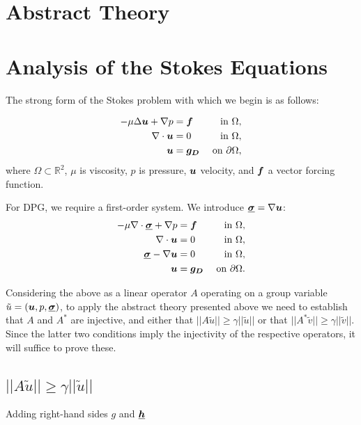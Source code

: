 

\section{Abstract Theory}

\section{Analysis of the Stokes Equations}
The strong form of the Stokes problem with which we begin is as follows:

\begin{align}
- \mu \Delta \vect{u} + \NVRgrad p &= \vect{f} & \text{ in } \Omega, \label{NVR:eq:strongfirst1} \\
\NVRdiv \vect{u} &= 0 & \text{ in } \Omega, \\
\vect{u} &= \vect{g_{D}} & \text{ on } \partial\Omega,\label{NVR:eq:stronglast1}
\end{align}
where $\Omega \subset \mathbb{R}^{2}$, $\mu$ is viscosity, $p$ is pressure, $\vect{u}$ velocity, and $\vect{f}$ a vector forcing function.

For DPG, we require a first-order system.  We introduce $\NVRtensor{\sigma}= \NVRgrad \vect{u}$:
\begin{align}
- \mu \NVRdiv \NVRtensor{\sigma} + \NVRgrad p &= \vect{f} & \text{ in } \Omega, \label{NVR:eq:strongfirst2} \\
\NVRdiv \vect{u} &= 0 & \text{ in } \Omega, \\
\NVRtensor{\sigma} - \NVRgrad \vect{u} &= 0 & \text{ in } \Omega,\\
\vect{u} &= \vect{g_{D}} & \text{ on } \partial\Omega.\label{NVR:eq:stronglast2}
\end{align}

Considering the above as a linear operator $A$ operating on a group variable $\tilde{u} = (\vect{u},p,\NVRtensor{\sigma})$, to apply the abstract theory presented above we need to establish that $A$ and $A^{*}$ are injective, and either that $||A \tilde{u}|| \geq \gamma ||\tilde{u}||$ or that $||A^{*} \tilde{v}|| \geq \gamma ||\tilde{v}||$.  Since the latter two conditions imply the injectivity of the respective operators, it will suffice to prove these.\\

\subsection{$||A \tilde{u}|| \geq \gamma ||\tilde{u}||$}
Adding right-hand sides $g$ and $\NVRtensor{h}$

